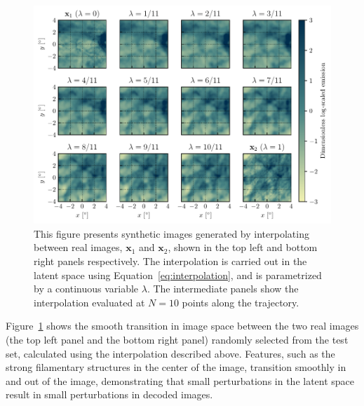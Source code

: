 \documentclass[fleqn,usenatbib]{mnras}
\begin{document}
\begin{figure}
    \centering
    \includegraphics{ ./semantic_interpolation.pdf}
    \caption{This figure presents synthetic images generated by interpolating between real images, $\mathbf x_1$ and $\mathbf x_2$, shown in the top left and bottom right panels respectively. The interpolation is carried out in the latent space using Equation~\ref{eq:interpolation}, and is parametrized by a continuous variable $\lambda$. The intermediate panels show the interpolation evaluated at $N=10$ points along the trajectory.}
    \label{fig:interpolation}
\end{figure}

Figure~\ref{fig:interpolation} shows the smooth transition in image space between the two real images (the top left panel and the bottom right panel) randomly selected from the test set, calculated using the interpolation described above. Features, such as the strong filamentary structures in the center of the image, transition smoothly in and out of the image, demonstrating that small perturbations in the latent space result in small perturbations in decoded images.
\end{document}
